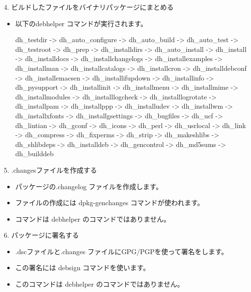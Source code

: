 \begin{frame}[containsverbatim]{4. ビルドしたファイルをバイナリパッケージにまとめる}
\begin{itemize}

\item 以下のdebhelper コマンドが実行されます。
\begin{commandline}
dh_testdir -> dh_auto_configure -> dh_auto_build -> dh_auto_test
-> dh_testroot -> dh_prep -> dh_installdirs -> dh_auto_install
-> dh_install -> dh_installdocs -> dh_installchangelogs
-> dh_installexamples -> dh_installman -> dh_installcatalogs
-> dh_installcron -> dh_installdebconf -> dh_installemacsen
-> dh_installifupdown -> dh_installinfo -> dh_pysupport
-> dh_installinit -> dh_installmenu -> dh_installmime
-> dh_installmodules -> dh_installlogcheck -> dh_installlogrotate
-> dh_installpam -> dh_installppp -> dh_installudev -> dh_installwm
-> dh_installxfonts -> dh_installgsettings -> dh_bugfiles -> dh_ucf
-> dh_lintian -> dh_gconf -> dh_icons -> dh_perl -> dh_usrlocal
-> dh_link -> dh_compress -> dh_fixperms -> dh_strip -> dh_makeshlibs
-> dh_shlibdeps -> dh_installdeb -> dh_gencontrol -> dh_md5sums
-> dh_builddeb
\end{commandline}

\end{itemize}
\end{frame}

\begin{frame}[containsverbatim]{5. .changesファイルを作成する}
\begin{itemize}

\item  パッケージの.changelog ファイルを作成します。
\item ファイルの作成には dpkg-genchanges コマンドが使われます。
\item コマンドは debhelper のコマンドではありません。

\end{itemize}
\end{frame}

\begin{frame}[containsverbatim]{6. パッケージに署名する}
\begin{itemize}

\item .dscファイルと.changes ファイルにGPG/PGPを使って署名をします。
\item この署名には debsign コマンドを使います。
\item このコマンドは debhelper のコマンドではありません。
\end{itemize}
\end{frame}

